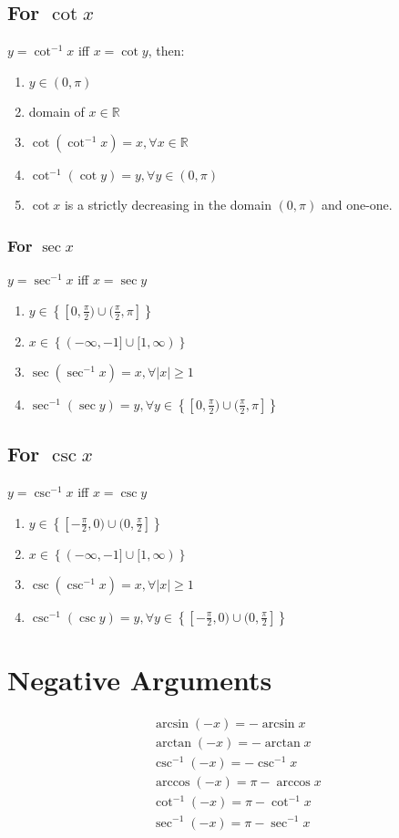 \subsection{For $\cot x$}
$y=\cot^{-1} x$ iff $x=\cot y$, then:
\begin{enumerate}
	\item $y \in (0,\pi)$
	\item domain of $x \in \mathbb{R}$
	\item $\cot(\cot^{-1} x)=x,\forall x\in\mathbb{R}$
	\item $\cot^{-1}(\cot y)=y, \forall y\in (0,\pi)$
	\item $\cot x$ is a strictly decreasing in the domain $(0,\pi)$ and one-one.
\end{enumerate}

\subsubsection{For $\sec x$}
$y=\sec^{-1} x$ iff $x=\sec y$
\begin{enumerate}
	\item $y\in\left\lbrace [0,\frac{\pi}{2})\cup(\frac{\pi}{2},\pi]\right\rbrace$
	\item $x\in\left\lbrace(-\infty,-1]\cup[1,\infty)\right\rbrace$
	\item $\sec(\sec^{-1}x)=x,\forall \lvert x \rvert \geq 1$
	\item $\sec^{-1}(\sec y)=y, \forall y \in \left\lbrace [0,\frac{\pi}{2})\cup(\frac{\pi}{2},\pi]\right\rbrace$
\end{enumerate}

\subsection{For $\csc x$}
$y=\csc^{-1} x$ iff $x=\csc y$
\begin{enumerate}
	\item $y\in\left\lbrace [-\frac{\pi}{2},0)\cup(0,\frac{\pi}{2}]\right\rbrace$
	\item $x\in\left\lbrace(-\infty,-1]\cup[1,\infty)\right\rbrace$
	\item $\csc(\csc^{-1}x)=x,\forall \lvert x \rvert \geq 1$
	\item $\csc^{-1}(\csc y)=y, \forall y \in \left\lbrace [-\frac{\pi}{2},0)\cup(0,\frac{\pi}{2}]\right\rbrace$
\end{enumerate}


\section{Negative Arguments}
\begin{align}
	\arcsin (-x)=-\arcsin x\\
	\arctan (-x)=-\arctan x\\
	\csc^{-1} (-x)=-\csc^{-1} x\\
	\arccos (-x)=\pi-\arccos x\\
	\cot^{-1} (-x)=\pi-\cot^{-1} x\\
	\sec^{-1} (-x)=\pi-\sec^{-1} x
\end{align}


